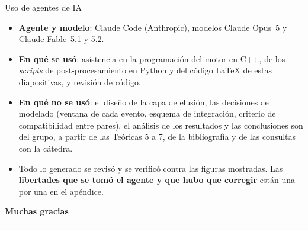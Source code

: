 \documentclass[aspectratio=169,11pt]{beamer}
\begin{document}
\begin{frame}{Uso de agentes de IA}
    \vfill
    \begin{center}
    \begin{minipage}{0.88\textwidth}
        \normalsize
        \begin{itemize}\setlength{\itemsep}{0.9em}
            \item \textbf{Agente y modelo}: Claude Code (Anthropic), modelos Claude
                  Opus~5 y Claude Fable~5.1 y 5.2.
            \item \textbf{En qué se usó}: asistencia en la programación del motor en
                  C++, de los \textit{scripts} de post-procesamiento en Python y del
                  código \LaTeX{} de estas diapositivas, y revisión de código.
            \item \textbf{En qué no se usó}: el diseño de la capa de elusión, las
                  decisiones de modelado (ventana de cada evento, esquema de
                  integración, criterio de compatibilidad entre pares), el análisis
                  de los resultados y las conclusiones son del grupo, a partir de las
                  Teóricas 5 a 7, de la bibliografía y de las consultas con la
                  cátedra.
            \item Todo lo generado se revisó y se verificó contra las figuras
                  mostradas. Las \textbf{libertades que se tomó el agente y que
                  hubo que corregir} están una por una en el apéndice.
        \end{itemize}
    \end{minipage}
    \end{center}
    \vfill
\end{frame}

\begin{frame}
    \vfill
    \begin{center}
        {\Large\bfseries\color{azul} Muchas gracias}\\[0.6em]
        \textcolor{azul!30}{\rule{0.25\textwidth}{1pt}}
    \end{center}
    \vfill
\end{frame}


\end{document}

